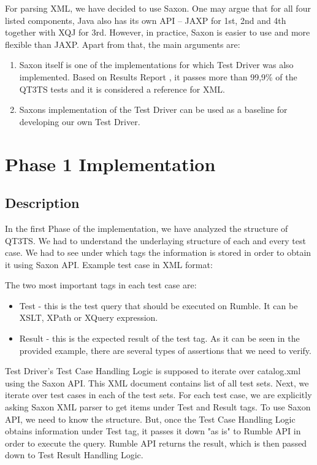 For parsing XML, we have decided to use Saxon. One may argue that for all four listed components, Java also has its own API – JAXP for 1st, 2nd and 4th together with XQJ for 3rd. However, in practice, Saxon is easier to use and more flexible than JAXP. Apart from that, the main arguments are:
\begin{enumerate}
	\item Saxon itself is one of the implementations for which Test Driver was also implemented. Based on Results Report \cite{SaxonReport}, it passes more than 99,9\% of the QT3TS tests and it is considered a reference for XML.
	\item Saxons implementation of the Test Driver can be used as a baseline for developing our own Test Driver. 
\end{enumerate}

\section{Phase 1 Implementation}
\subsection{Description}
\label{Phase1_Description}
In the first Phase of the implementation, we have analyzed the structure of QT3TS. We had to understand the underlaying structure of each and every test case. We had to see under which tags the information is stored in order to obtain it using Saxon API. Example test case in XML format:



The two most important tags in each test case are:
\begin{itemize}
	\item Test  - this is the test query that should be executed on Rumble. It can be XSLT, XPath or XQuery expression.
	\item Result - this is the expected result of the test tag. As it can be seen in the provided example, there are several types of assertions that we need to verify.
\end{itemize}

Test Driver's Test Case Handling Logic is supposed to iterate over catalog.xml using the Saxon API. This XML document contains list of all test sets. Next, we iterate over test cases in each of the test sets. For each test case, we are explicitly asking Saxon XML parser to get items under Test and Result tags. To use Saxon API, we need to know the structure. But, once the Test Case Handling Logic obtains information under Test tag, it passes it down "as is" to Rumble API in order to execute the query. Rumble API returns the result, which is then passed down to Test Result Handling Logic. 

